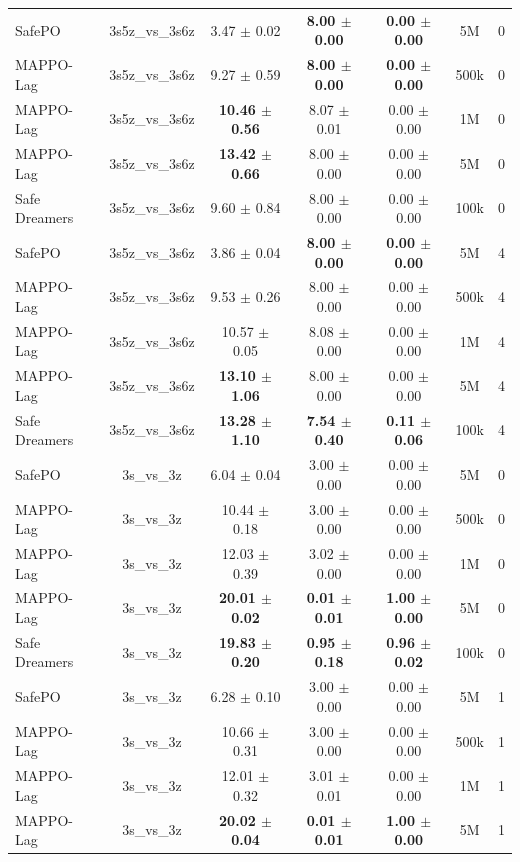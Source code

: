 \documentclass{article}
\begin{document}
\begin{longtable}{lcccccc}
\midrule
SafePO & 3s5z\_vs\_3s6z & 3.47 $\pm$ 0.02 & \textbf{8.00 $\pm$ 0.00} & \textbf{0.00 $\pm$ 0.00} & 5M & 0 \\
MAPPO-Lag & 3s5z\_vs\_3s6z & 9.27 $\pm$ 0.59 & \textbf{8.00 $\pm$ 0.00} & \textbf{0.00 $\pm$ 0.00} & 500k & 0 \\
MAPPO-Lag & 3s5z\_vs\_3s6z & \textbf{10.46 $\pm$ 0.56} & 8.07 $\pm$ 0.01 & 0.00 $\pm$ 0.00 & 1M & 0 \\
MAPPO-Lag & 3s5z\_vs\_3s6z & \textbf{13.42 $\pm$ 0.66} & 8.00 $\pm$ 0.00 & 0.00 $\pm$ 0.00 & 5M & 0 \\
Safe Dreamers & 3s5z\_vs\_3s6z & 9.60 $\pm$ 0.84 & 8.00 $\pm$ 0.00 & 0.00 $\pm$ 0.00 & 100k & 0 \\
\midrule
SafePO & 3s5z\_vs\_3s6z & 3.86 $\pm$ 0.04 & \textbf{8.00 $\pm$ 0.00} & \textbf{0.00 $\pm$ 0.00} & 5M & 4 \\
MAPPO-Lag & 3s5z\_vs\_3s6z & 9.53 $\pm$ 0.26 & 8.00 $\pm$ 0.00 & 0.00 $\pm$ 0.00 & 500k & 4 \\
MAPPO-Lag & 3s5z\_vs\_3s6z & 10.57 $\pm$ 0.05 & 8.08 $\pm$ 0.00 & 0.00 $\pm$ 0.00 & 1M & 4 \\
MAPPO-Lag & 3s5z\_vs\_3s6z & \textbf{13.10 $\pm$ 1.06} & 8.00 $\pm$ 0.00 & 0.00 $\pm$ 0.00 & 5M & 4 \\
Safe Dreamers & 3s5z\_vs\_3s6z & \textbf{13.28 $\pm$ 1.10} & \textbf{7.54 $\pm$ 0.40} & \textbf{0.11 $\pm$ 0.06} & 100k & 4 \\
\midrule
SafePO & 3s\_vs\_3z & 6.04 $\pm$ 0.04 & 3.00 $\pm$ 0.00 & 0.00 $\pm$ 0.00 & 5M & 0 \\
MAPPO-Lag & 3s\_vs\_3z & 10.44 $\pm$ 0.18 & 3.00 $\pm$ 0.00 & 0.00 $\pm$ 0.00 & 500k & 0 \\
MAPPO-Lag & 3s\_vs\_3z & 12.03 $\pm$ 0.39 & 3.02 $\pm$ 0.00 & 0.00 $\pm$ 0.00 & 1M & 0 \\
MAPPO-Lag & 3s\_vs\_3z & \textbf{20.01 $\pm$ 0.02} & \textbf{0.01 $\pm$ 0.01} & \textbf{1.00 $\pm$ 0.00} & 5M & 0 \\
Safe Dreamers & 3s\_vs\_3z & \textbf{19.83 $\pm$ 0.20} & \textbf{0.95 $\pm$ 0.18} & \textbf{0.96 $\pm$ 0.02} & 100k & 0 \\
\midrule
SafePO & 3s\_vs\_3z & 6.28 $\pm$ 0.10 & 3.00 $\pm$ 0.00 & 0.00 $\pm$ 0.00 & 5M & 1 \\
MAPPO-Lag & 3s\_vs\_3z & 10.66 $\pm$ 0.31 & 3.00 $\pm$ 0.00 & 0.00 $\pm$ 0.00 & 500k & 1 \\
MAPPO-Lag & 3s\_vs\_3z & 12.01 $\pm$ 0.32 & 3.01 $\pm$ 0.01 & 0.00 $\pm$ 0.00 & 1M & 1 \\
MAPPO-Lag & 3s\_vs\_3z & \textbf{20.02 $\pm$ 0.04} & \textbf{0.01 $\pm$ 0.01} & \textbf{1.00 $\pm$ 0.00} & 5M & 1 \\

\end{longtable}
\end{document}
